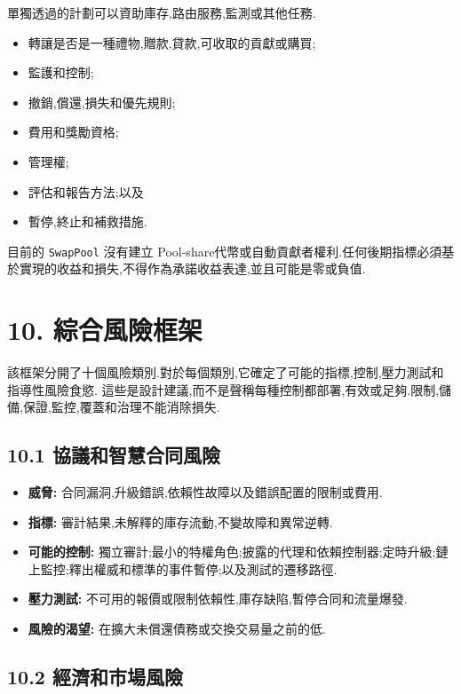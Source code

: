 \documentclass[11pt]{article}
\begin{document}
單獨透過的計劃可以資助庫存,路由服務,監測或其他任務.

\begin{itemize}[leftmargin=*]
\item 轉讓是否是一種禮物,贈款,貸款,可收取的貢獻或購買;
\item 監護和控制;
\item 撤銷,償還,損失和優先規則;
\item 費用和獎勵資格;
\item 管理權;
\item 評估和報告方法;以及
\item 暫停,終止和補救措施.
\end{itemize}
目前的 \texttt{SwapPool} 沒有建立 Pool-share代幣或自動貢獻者權利.任何後期指標必須基於實現的收益和損失,不得作為承諾收益表達,並且可能是零或負值.


\section*{10. 綜合風險框架}

該框架分開了十個風險類別.對於每個類別,它確定了可能的指標,控制,壓力測試和指導性風險食慾. 這些是設計建議,而不是聲稱每種控制都部署,有效或足夠.限制,儲備,保證,監控,覆蓋和治理不能消除損失.

\subsection*{10.1 協議和智慧合同風險}

\begin{itemize}[leftmargin=*]
\item \textbf{威脅:} 合同漏洞,升級錯誤,依賴性故障以及錯誤配置的限制或費用.
\item \textbf{指標:} 審計結果,未解釋的庫存流動,不變故障和異常逆轉.
\item \textbf{可能的控制:} 獨立審計;最小的特權角色;披露的代理和依賴控制器;定時升級;鏈上監控;釋出權威和標準的事件暫停;以及測試的遷移路徑.
\item \textbf{壓力測試:} 不可用的報價或限制依賴性,庫存缺陷,暫停合同和流量爆發.
\item \textbf{風險的渴望:} 在擴大未償還債務或交換交易量之前的低.
\end{itemize}
\subsection*{10.2 經濟和市場風險}
\end{document}

